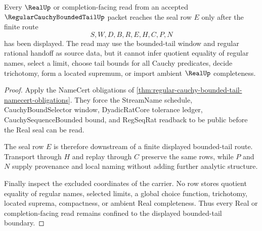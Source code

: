 \begin{theorem}
\label{thm:regular-cauchy-bounded-tail-window-boundary}
Every $\RealUp$ or completion-facing read from an accepted $\RegularCauchyBoundedTailUp$ packet reaches the seal row $E$ only after the finite route
$$
S,W,D,B,R,E,H,C,P,N
$$
has been displayed. The read may use the bounded-tail window and regular rational handoff as source data, but it cannot infer quotient equality of regular names, select a limit, choose tail bounds for all Cauchy predicates, decide trichotomy, form a located supremum, or import ambient $\RealUp$ completeness.
\end{theorem}
\begin{proof}
Apply the NameCert obligations of \autoref{thm:regular-cauchy-bounded-tail-namecert-obligations}. They force the StreamName schedule, CauchyBoundSelector window, DyadicRatCore tolerance ledger, CauchySequenceBounded bound, and RegSeqRat readback to be public before the Real seal can be read.

The seal row $E$ is therefore downstream of a finite displayed bounded-tail route. Transport through $H$ and replay through $C$ preserve the same rows, while $P$ and $N$ supply provenance and local naming without adding further analytic structure.

Finally inspect the excluded coordinates of the carrier. No row stores quotient equality of regular names, selected limits, a global choice function, trichotomy, located suprema, compactness, or ambient Real completeness. Thus every Real or completion-facing read remains confined to the displayed bounded-tail boundary.
\end{proof}



